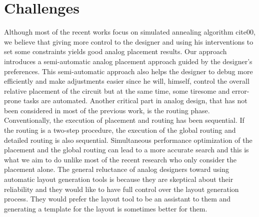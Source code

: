 \chapter{Challenges}

Although most of the recent works focus on simulated annealing algorithm cite{00}, we believe that giving more control to the designer and using his interventions to set some constraints yields good analog placement results. Our approach introduces a semi-automatic analog placement approach guided by the designer's preferences. This semi-automatic approach also helps the designer to debug more efficiently and make adjustments easier since he will, himself, control the overall relative placement of the circuit but at the same time, some tiresome and error-prone tasks are automated.
\newline 
\newline 
\indent Another critical part in analog design, that has not been considered in most of the previous work, is the routing phase. Conventionally, the execution of placement and routing has been sequential. If the routing is a two-step procedure, the execution of the global routing and detailed routing is also sequential. Simultaneous performance optimization of the placement and the global routing can lead to a more accurate search and this is what we aim to do unlike most of the recent research who only consider the placement alone. The general reluctance of analog designers toward using automatic layout generation tools is because they are skeptical about their reliability and they would like to have full control over the layout generation process. They would prefer the layout tool to be an assistant to them and generating a template for the layout is sometimes better for them.

